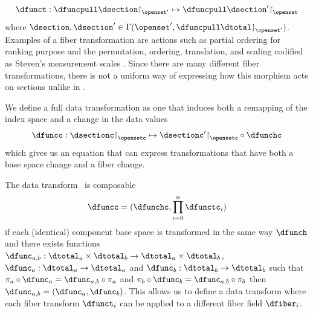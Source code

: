 \documentclass[10pt,journal,compsoc]{IEEEtran}
\renewcommand{\restriction}{\mathord{\upharpoonright}} %
\theoremstyle{definition}
\theoremstyle{remark}
\begin{document}
\begin{equation}
  \label{eq:atct:morphism:fiber}
  \dfunct: \dfuncpull \dsection \restriction_{\openset^{\prime}} \mapsto \dfuncpull \dsection^{\prime} \restriction_{\openset}
\end{equation}
where $\dsection, \dsection^{\prime} \in \Gamma(\openset^{\prime}, \dfuncpull\dtotal\restriction_{\openset^{\prime}})$. Examples of a fiber transformation are actions such as partial ordering for ranking purpose \cite{bruggemannRankingPrioritizationMultiindicator2011} and the permutation, ordering, translation, and scaling codified as Steven's measurement scales \cite{stevensTheoryScalesMeasurement1946}. Since there are many different fiber transformations,  there is not a uniform way of expressing how this morphism acts on sections unlike in \label{eq:atct:morphism:verify_base}.

We define a full data transformation as one that induces both a remapping of the index space and a change in the data values
\begin{equation}
  \label{eq:atct:morphism:all}
  \dfuncc: \dsectionc\restriction_{\opensetc} \mapsto \dsectionc^{\prime}\restriction_{\opensetc} \circ \dfunchc
\end{equation}
which gives us an equation that can express transformations that have both a base space change and a fiber change. 

The data transform \dfunc\ is composable 
\begin{equation}
  \dfuncc = (\dfunchc, \prod\limits_{i=0}^{n}\dfunctc_i)
\end{equation}
if each (identical) component base space is transformed in the same way $\dfunch$ and there exists functions $\dfunc_{a,b}: \dtotal_a \times \dtotal_b \rightarrow \dtotal_a \times \dtotal_b$, $\dfunc_{a}: \dtotal_a \rightarrow \dtotal_a$ and $\dfunc_{b}: \dtotal_b \rightarrow \dtotal_b$ such that $\pi_a \circ \dfunc_a = \dfunc_{a,b} \circ \pi_a$ and $\pi_b \circ \dfunc_b = \dfunc_{a,b} \circ \pi_b$ then $\dfunc_{a,b} = (\dfunc_a, \dfunc_b)$. This allows us to define a data transform where each fiber transform $\dfunct_{i}$ can be applied to a different fiber field $\dfiber_i$. 
\end{document}

